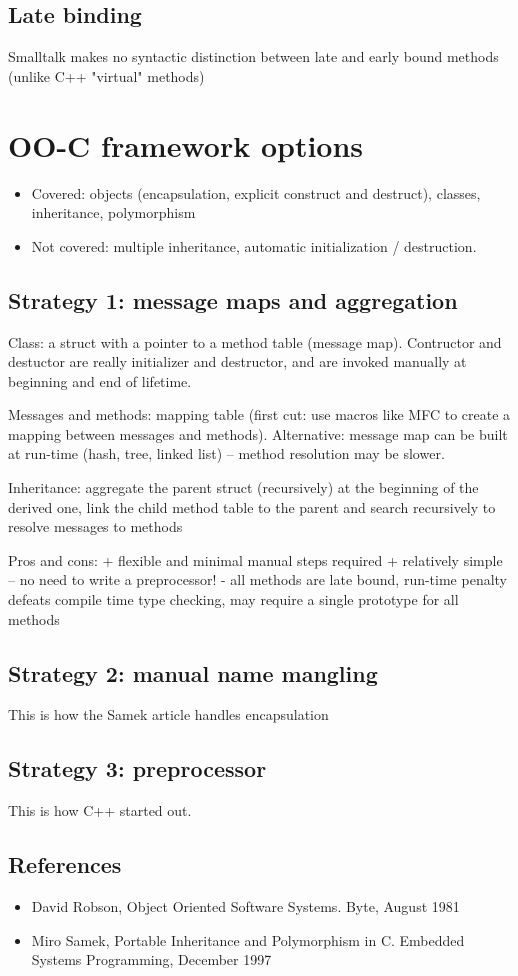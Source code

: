 \subsection{Late binding}
Smalltalk makes no syntactic distinction between late and early bound
methods (unlike C++ "virtual" methods) 


\section{OO-C framework options}
\begin{itemize}[noitemsep]
	\item Covered: objects (encapsulation, explicit construct and
	destruct), classes, inheritance, polymorphism 

	\item Not covered: multiple inheritance, automatic
	initialization / destruction. 
\end{itemize}


\subsection{Strategy 1: message maps and aggregation}
Class: a struct with a pointer to a method table (message map).
Contructor and destuctor are really initializer and destructor, and are
invoked manually at beginning and end of lifetime.

Messages and methods: mapping table (first cut: use macros like MFC to
create a mapping between messages and methods). Alternative: message map
can be built at run-time (hash, tree, linked list) – method resolution
may be slower.

Inheritance: aggregate the parent struct (recursively) at the beginning
of the derived one, link the child method table to the parent and search
recursively to resolve messages to methods

Pros and cons:
+ flexible and minimal manual steps required
+ relatively simple – no need to write a preprocessor!
- all methods are late bound, run-time penalty defeats compile time type
checking, may require a single prototype for all methods


\subsection{Strategy 2: manual name mangling}
This is how the Samek article handles encapsulation


\subsection{Strategy 3: preprocessor}
This is how C++ started out.


\subsection{References}
\begin{itemize}[noitemsep]
	\item David Robson, Object Oriented Software Systems. Byte,
	August 1981

	\item Miro Samek, Portable Inheritance and Polymorphism in C.
	Embedded Systems Programming, December 1997
\end{itemize}
